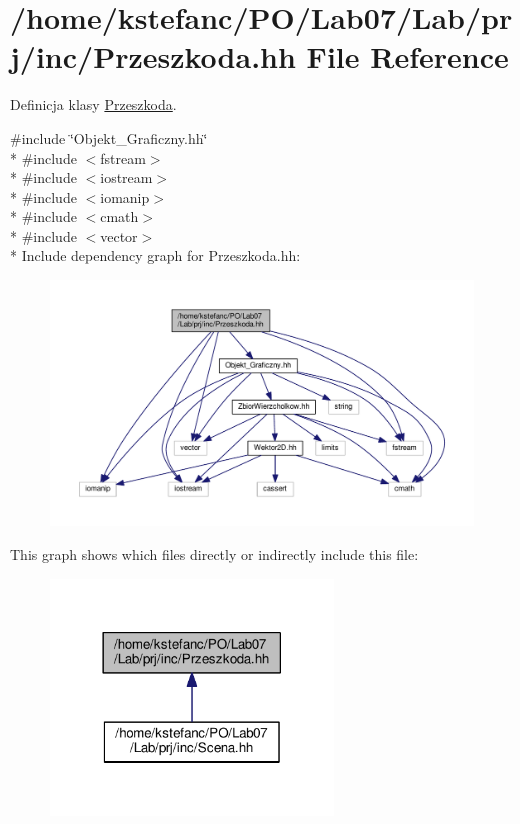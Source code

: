 \hypertarget{_przeszkoda_8hh}{\section{/home/kstefanc/\+P\+O/\+Lab07/\+Lab/prj/inc/\+Przeszkoda.hh File Reference}
\label{_przeszkoda_8hh}
}


Definicja klasy \hyperlink{class_przeszkoda}{Przeszkoda}.  


{\ttfamily \#include \char`\"{}Objekt\+\_\+\+Graficzny.\+hh\char`\"{}}\\*
{\ttfamily \#include $<$fstream$>$}\\*
{\ttfamily \#include $<$iostream$>$}\\*
{\ttfamily \#include $<$iomanip$>$}\\*
{\ttfamily \#include $<$cmath$>$}\\*
{\ttfamily \#include $<$vector$>$}\\*
Include dependency graph for Przeszkoda.\+hh\+:\nopagebreak
\begin{figure}[H]
\begin{center}
\leavevmode
\includegraphics[width=350pt]{_przeszkoda_8hh__incl}
\end{center}
\end{figure}
This graph shows which files directly or indirectly include this file\+:\nopagebreak
\begin{figure}[H]
\begin{center}
\leavevmode
\includegraphics[width=213pt]{_przeszkoda_8hh__dep__incl}
\end{center}
\end{figure}
